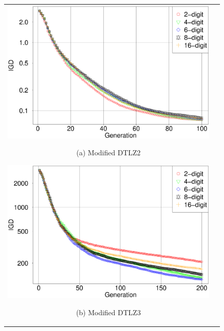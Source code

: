 \documentclass[../main/main]{subfiles}
\begin{document}
\begin{figure}[htbp]
\begin{tabular}{cc}
\begin{minipage}{0.32\hsize}
\includegraphics[width=1\linewidth]{../figures/MOEAD/DTLZ2_another_IGD.eps}
\begin{center}
{\footnotesize (a) Modified DTLZ2}
\end{center}
\end{minipage}
\begin{minipage}{0.32\hsize}
\includegraphics[width=1\linewidth]{../figures/MOEAD/DTLZ3_another_IGD.eps}
\begin{center}
{\footnotesize (b) Modified DTLZ3}
\end{center}
\end{minipage}
\begin{minipage}{0.32\hsize}

\end{minipage}
\end{tabular}
\end{figure}
\end{document}
